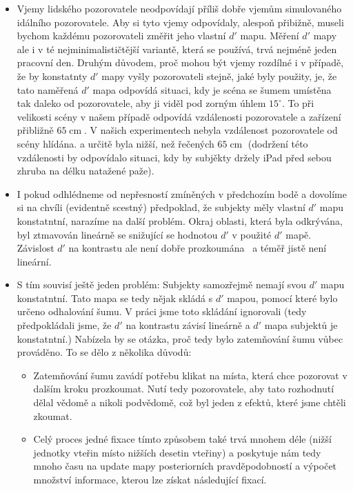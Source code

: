 \begin{itemize}
\item Vjemy lidského pozorovatele neodpovídají příliš dobře vjemům simulovaného
idálního pozorovatele. Aby si tyto vjemy odpovídaly, alespoň přibižně, museli
bychom každému pozorovateli změřit jeho vlastní $d'$ mapu. Měření $d'$ mapy ale
i  v té nejminimalističtější variantě, která se používá, trvá nejméně jeden
pracovní den. Druhým důvodem, proč mohou být vjemy rozdílné i v případě, že by
konstatnty $d'$ mapy vyšly pozorovateli stejně, jaké byly použity, je, že tato
naměřená $d'$ mapa odpovídá situaci, kdy je scéna se šumem umístěna tak daleko
od pozorovatele, aby ji viděl pod zorným úhlem $15^\circ$. To při velikosti
scény v našem případě odpovídá vzdálenosti pozorovatele a zařízení přibližně
$65 \operatorname{cm}$. V našich experimentech nebyla vzdálenost pozorovatele od
scény hlídána. a určitě byla nižší, než řečených $65 \operatorname{cm}$
(dodržení této vzdálenosti by odpovídalo situaci, kdy by subjěkty držely iPad
před sebou zhruba na délku natažené paže). 

\item I pokud odhlédneme od nepřesností zmíněných v předchozím bodě a dovolíme
si na chvíli (evidentně scestný) předpoklad, že subjekty měly vlastní $d'$ mapu
konstatntní, narazíme na další problém. Okraj oblasti, která byla odkrývána,
byl ztmavován lineárně se snižující se hodnotou $d'$ v použité $d'$ mapě.
Závislost $d'$ na kontrastu ale není dobře prozkoumána \ a téměř jistě
není lineární.

\item S tím souvisí ještě jeden problém: Subjekty samozřejmě nemají svou $d'$
mapu konstatntní. Tato mapa se tedy nějak skládá s $d'$ mapou, pomocí které
bylo určeno odhalování šumu. V práci jsme toto skládání ignorovali (tedy
předpokládali jsme, že $d'$ na kontrastu závisí lineárně a $d'$ mapa subjektů
je konstatntní.) Nabízela by se otázka, proč tedy bylo zatemňování šumu vůbec
prováděno. To se dělo z několika důvodů:

\begin{itemize}

\item Zatemňování šumu zavádí potřebu klikat na místa, která chce pozorovat v
dalším kroku prozkoumat. Nutí tedy pozorovatele, aby tato rozhodnutí dělal
vědomě a nikoli podvědomě, což byl jeden z efektů, které jsme chtěli zkoumat.

\item Celý proces jedné fixace tímto způsobem také trvá mnohem déle (nižší
jednotky vteřin místo nižších desetin vteřiny) a poskytuje nám tedy mnoho času
na update mapy posteriorních pravděpodobností a výpočet množství informace,
kterou lze získat následující fixací.


\end{itemize}
\end{itemize}

